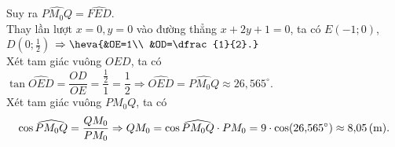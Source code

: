 \begin{ex}
{\begin{enumerate}[+)]
	\end{enumerate}
	Suy ra $\widehat{PM_0Q}=\widehat{FED}$.\\
	Thay lần lượt $x=0, y=0$ vào đường thẳng $x+2y+1=0$, ta có $E(-1;0)$, $D\left(0;\frac{1}{2}\right)$ $\Rightarrow \heva{&OE=1\\ &OD=\dfrac{1}{2}.}$\\
	Xét tam giác vuông $OED$, ta có $\tan\widehat{OED}=\dfrac{OD}{OE}=\dfrac{\frac{1}{2}}{1} =\dfrac{1}{2} \Rightarrow \widehat{OED}=\widehat{PM_0Q}\approx26{,}565^\circ$.\\
	Xét tam giác vuông $PM_0Q$, ta có $$\cos\widehat{PM_0Q}=\dfrac{QM_0}{PM_0} \Rightarrow QM_0=\cos\widehat{PM_0Q}\cdot PM_0 =9\cdot\cos(26{,}565^\circ)\approx8{,}05\, (\rm m).$$
	}
\end{ex}

